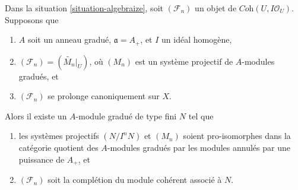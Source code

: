 \begin{lemma}
\label{lemma-Gm-equivariant-extend-canonically}
Dans la situation \ref{situation-algebraize}, soit $(\mathcal{F}_n)$ un
objet de $\textit{Coh}(U, I\mathcal{O}_U)$. Supposons que
\begin{enumerate}
\item $A$ soit un anneau gradué, $\mathfrak a = A_+$, et
$I$ un idéal homogène,
\item $(\mathcal{F}_n) = (\widetilde{M_n}|_U)$, où $(M_n)$
est un système projectif de $A$-modules gradués, et
\item $(\mathcal{F}_n)$ se prolonge canoniquement sur $X$.
\end{enumerate}
Alors il existe un $A$-module gradué de type fini $N$ tel que
\begin{enumerate}
\item[(a)] les systèmes projectifs $(N/I^nN)$ et $(M_n)$ soient pro-isomorphes
dans la catégorie quotient des $A$-modules gradués par les modules annulés par une puissance de $A_+$,
et
\item[(b)] $(\mathcal{F}_n)$ soit la complétion du module cohérent
associé à $N$.
\end{enumerate}
\end{lemma}

